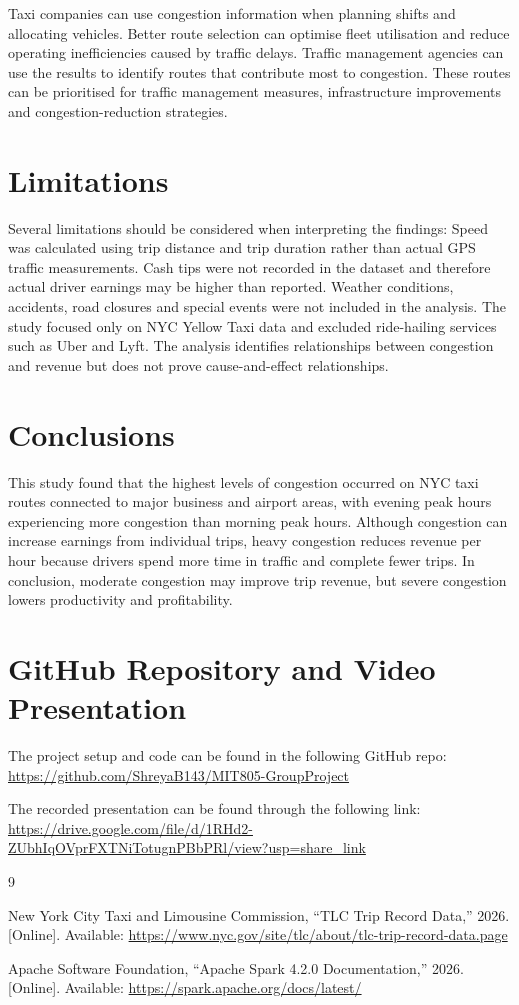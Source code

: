 \documentclass[conference]{IEEEtran}
\begin{document}
Taxi companies can use congestion information when planning shifts and allocating vehicles. Better route selection can optimise fleet utilisation and reduce operating inefficiencies caused by traffic delays. Traffic management agencies can use the results to identify routes that contribute most to congestion. These routes can be prioritised for traffic management measures, infrastructure improvements and congestion-reduction strategies.

\section{Limitations}
Several limitations should be considered when interpreting the findings:
Speed was calculated using trip distance and trip duration rather than actual GPS traffic measurements.
Cash tips were not recorded in the dataset and therefore actual driver earnings may be higher than reported.
Weather conditions, accidents, road closures and special events were not included in the analysis.
The study focused only on NYC Yellow Taxi data and excluded ride-hailing services such as Uber and Lyft.
The analysis identifies relationships between congestion and revenue but does not prove cause-and-effect relationships.

\section{Conclusions}
This study found that the highest levels of congestion occurred on NYC taxi routes connected to major business and airport areas, with evening peak hours experiencing more congestion than morning peak hours. Although congestion can increase earnings from individual trips, heavy congestion reduces revenue per hour because drivers spend more time in traffic and complete fewer trips. In conclusion, moderate congestion may improve trip revenue, but severe congestion lowers productivity and profitability.

\section{GitHub Repository and Video Presentation}
The project setup and code can be found in the following GitHub repo: \url{https://github.com/ShreyaB143/MIT805-GroupProject}

The recorded presentation can be found through the following link: \url{https://drive.google.com/file/d/1RHd2-ZUbhIqOVprFXTNiTotugnPBbPRl/view?usp=share_link}

\begin{thebibliography}{9}

New York City Taxi and Limousine Commission, ``TLC Trip Record Data,''
2026. [Online]. Available: \url{https://www.nyc.gov/site/tlc/about/tlc-trip-record-data.page}

Apache Software Foundation, ``Apache Spark 4.2.0 Documentation,''
2026. [Online]. Available: \url{https://spark.apache.org/docs/latest/}

\end{thebibliography}
\end{document}
